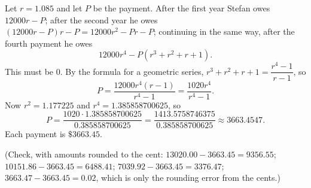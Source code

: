 Let $r=1.085$ and let $P$ be the payment. After the first year Stefan owes $12000r-P$; after the second year he owes $(12000r-P)r-P=12000r^2-Pr-P$; continuing in the same way, after the fourth payment he owes
\[12000r^4-P\left(r^3+r^2+r+1\right).\]
This must be $0$. By the formula for a geometric series, $r^3+r^2+r+1=\dfrac{r^4-1}{r-1}$, so
\[P=\dfrac{12000r^4(r-1)}{r^4-1}=\dfrac{1020r^4}{r^4-1}.\]
Now $r^2=1.177225$ and $r^4=1.385858700625$, so
\[P=\dfrac{1020\cdot1.385858700625}{0.385858700625}=\dfrac{1413.5758746375}{0.385858700625}\approx3663.4547.\]
Each payment is $\boxed{\$3663.45}$.

(Check, with amounts rounded to the cent: $13020.00-3663.45=9356.55$; $10151.86-3663.45=6488.41$; $7039.92-3663.45=3376.47$; $3663.47-3663.45=0.02$, which is only the rounding error from the cents.)
